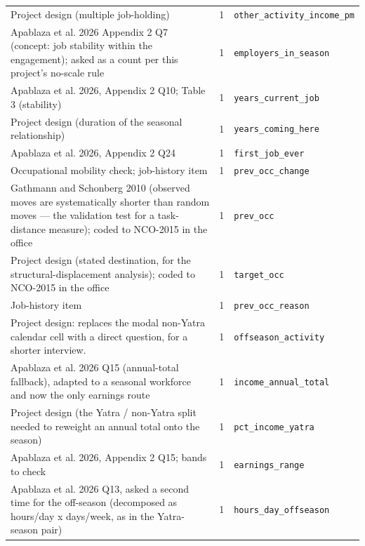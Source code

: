\documentclass[9pt,a4paper,landscape]{article}
\begin{document}
\begin{longtable}{@{}p{9.5cm}p{1.2cm}p{12.5cm}@{}}
\scriptsize Project design (multiple job-holding) & \scriptsize 1 & \scriptsize\texttt{other\_activity\_income\_pm}\\
\scriptsize Apablaza et al. 2026 Appendix 2 Q7 (concept: job stability within the engagement); asked as a count per this project's no-scale rule & \scriptsize 1 & \scriptsize\texttt{employers\_in\_season}\\
\scriptsize Apablaza et al. 2026, Appendix 2 Q10; Table 3 (stability) & \scriptsize 1 & \scriptsize\texttt{years\_current\_job}\\
\scriptsize Project design (duration of the seasonal relationship) & \scriptsize 1 & \scriptsize\texttt{years\_coming\_here}\\
\scriptsize Apablaza et al. 2026, Appendix 2 Q24 & \scriptsize 1 & \scriptsize\texttt{first\_job\_ever}\\
\scriptsize Occupational mobility check; job-history item & \scriptsize 1 & \scriptsize\texttt{prev\_occ\_change}\\
\scriptsize Gathmann and Schonberg 2010 (observed moves are systematically shorter than random moves — the validation test for a task-distance measure); coded to NCO-2015 in the office & \scriptsize 1 & \scriptsize\texttt{prev\_occ}\\
\scriptsize Project design (stated destination, for the structural-displacement analysis); coded to NCO-2015 in the office & \scriptsize 1 & \scriptsize\texttt{target\_occ}\\
\scriptsize Job-history item & \scriptsize 1 & \scriptsize\texttt{prev\_occ\_reason}\\
\scriptsize Project design: replaces the modal non-Yatra calendar cell with a direct question, for a shorter interview. & \scriptsize 1 & \scriptsize\texttt{offseason\_activity}\\
\scriptsize Apablaza et al. 2026 Q15 (annual-total fallback), adapted to a seasonal workforce and now the only earnings route & \scriptsize 1 & \scriptsize\texttt{income\_annual\_total}\\
\scriptsize Project design (the Yatra / non-Yatra split needed to reweight an annual total onto the season) & \scriptsize 1 & \scriptsize\texttt{pct\_income\_yatra}\\
\scriptsize Apablaza et al. 2026, Appendix 2 Q15; bands to check & \scriptsize 1 & \scriptsize\texttt{earnings\_range}\\
\scriptsize Apablaza et al. 2026 Q13, asked a second time for the off-season (decomposed as hours/day x days/week, as in the Yatra-season pair) & \scriptsize 1 & \scriptsize\texttt{hours\_day\_offseason}\\

\end{longtable}
\end{document}

